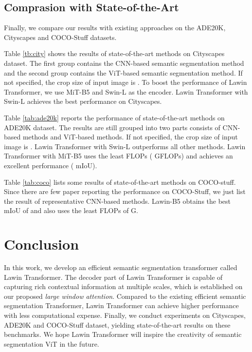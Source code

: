 \documentclass[10pt,twocolumn,letterpaper]{article}
\begin{document}
\subsection{Comprasion with State-of-the-Art}
Finally, we compare our results with existing approaches on the ADE20K, Cityscapes and COCO-Stuff datasets. 

Table \ref{tb:city} shows the results of state-of-the-art methods on Cityscapes dataset. The first group contains the CNN-based semantic segmentation method and the second group contains the ViT-based semantic segmentation method. If not specified, the crop size of input image is . To boost the performance of Lawin Transformer, we use MiT-B5 and Swin-L as the encoder. Lawin Transformer with Swin-L achieves the best performance on Cityscapes. 

Table \ref{tab:ade20k} reports the performance of state-of-the-art methods on ADE20K dataset. The results are still grouped into two parts consists of CNN-based methods and ViT-based methods. If not specified, the crop size of input image is . Lawin Transformer with Swin-L outperforms all other methods. Lawin Transformer with MiT-B5 uses the least FLOPs ( GFLOPs) and achieves an excellent performance ( mIoU). 

Table \ref{tab:coco} lists some results of state-of-the-art methods on COCO-stuff. Since there are few paper reporting the performance on COCO-Stuff, we just list the result of representative CNN-based methods. Lawin-B5 obtains the best mIoU of  and also uses the least FLOPs of G.





\section{Conclusion}
In this work, we develop an efficient semantic segmentation transformer called Lawin Transformer. The decoder part of Lawin Transformer is capable of capturing rich contextual information at multiple scales, which is established on our proposed \textit{large window attention}. Compared to the existing efficient semantic segmentation Transformer, Lawin Transformer can achieve higher performance with less computational expense. Finally, we conduct experiments on Cityscapes, ADE20K and COCO-Stuff dataset, yielding state-of-the-art results on these benchmarks. We hope Lawin Transformer will inspire the creativity of semantic segmentation ViT in the future.
{\small


}
\end{document}
